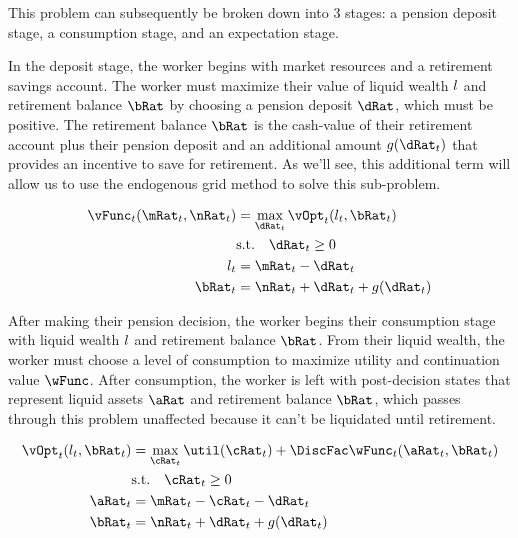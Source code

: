 \documentclass[\econtexRoot/EGMN]{subfiles}
\begin{document}
This problem can subsequently be broken down into 3 stages: a pension deposit stage, a consumption stage, and an expectation stage.

In the deposit stage, the worker begins with market resources and a retirement savings account. The worker must maximize their value of liquid wealth $l$ and retirement balance $\bRat$ by choosing a pension deposit $\dRat$, which must be positive. The retirement balance $\bRat$ is the cash-value of their retirement account plus their pension deposit and an additional amount $g(\dRat_{t})$ that provides an incentive to save for retirement. As we'll see, this additional term will allow us to use the endogenous grid method to solve this sub-problem.

\begin{equation}
    \begin{split}
        \vFunc_{t}(\mRat_{t}, \nRat_{t}) & = \max_{\dRat_{t}} \vOpt_{t}(\lRat_{t}, \bRat_{t}) \\
        & \text{s.t.}  \quad \dRat_{t} \ge 0 \\
        \lRat_{t} & = \mRat_{t} - \dRat_{t} \\
        \bRat_{t} & = \nRat_{t} + \dRat_{t} + g(\dRat_{t})
    \end{split}
\end{equation}

After making their pension decision, the worker begins their consumption stage with liquid wealth $l$ and retirement balance $\bRat$. From their liquid wealth, the worker must choose a level of consumption to maximize utility and continuation value $\wFunc$. After consumption, the worker is left with post-decision states that represent liquid assets $\aRat$ and retirement balance $\bRat$, which passes through this problem unaffected because it can't be liquidated until retirement.

\begin{equation}
    \begin{split}
        \vOpt_{t}(\lRat_{t}, \bRat_{t}) & = \max_{\cRat_{t}} \util(\cRat_{t}) + \DiscFac \wFunc_{t}(\aRat_{t}, \bRat_{t})  \\
        & \text{s.t.} \quad \cRat_{t} \ge 0 \\
        \aRat_{t} & = \mRat_{t} - \cRat_{t} - \dRat_{t} \\
        \bRat_{t} & = \nRat_{t} + \dRat_{t} + g(\dRat_{t})
    \end{split}
\end{equation}
\end{document}
